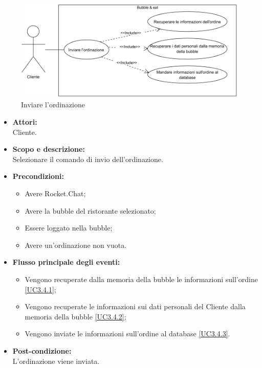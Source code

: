 
\begin{figure}[H]
	\centering
	\includegraphics[width=15cm]{../../documenti/AnalisiDeiRequisiti/Diagrammi_img/uc3_4.png}
	\caption{\UCCaption{} Inviare l'ordinazione}
\end{figure}

\begin{itemize}
	\item \textbf{Attori:}
	\\Cliente.
	\item \textbf{Scopo e descrizione:} 
	\\Selezionare il comando di invio dell'ordinazione.
	\item \textbf{Precondizioni:}
	\begin{itemize}
		\item Avere Rocket.Chat;
		\item Avere la bubble del ristorante selezionato;
		\item Essere loggato nella bubble;
		\item Avere un'ordinazione non vuota.
	\end{itemize}
	\item \textbf{Flusso principale degli eventi:}
	\begin{itemize}
		\item Vengono recuperate dalla memoria della bubble le informazioni sull'ordine \ref{UC3.4.1};
		\item Vengono recuperate le informazioni sui dati personali del Cliente dalla memoria della bubble \ref{UC3.4.2};
		\item Vengono inviate le informazioni sull'ordine al database \ref{UC3.4.3}.
	\end{itemize}
	\item \textbf{Post-condizione:}
	\\L'ordinazione viene inviata.
\end{itemize}

